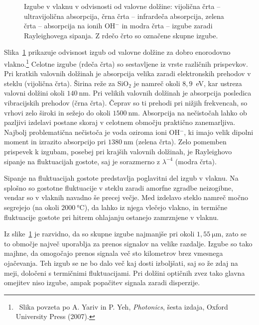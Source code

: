 \begin{figure}[ht]
\centering
\def\svgwidth{90truemm} 
 
\caption{Izgube v vlaknu v odvisnosti od valovne dolžine: vijolična črta --
ultravijolična absorpcija, 
črna črta -- infrardeča absorpcija, 
zelena črta -- absorpcija na ionih OH$^{-}$ in modra črta --
izgube zaradi Rayleighovega sipanja. Z rdečo črto so označene skupne izgube.}
\label{FibAbs}
\end{figure}
Slika~\ref{FibAbs} prikazuje odvisnost izgub od valovne dolžine 
za dobro enorodovno vlakno.\footnote{~Slika povzeta po
A. Yariv in P. Yeh, {\it Photonics}, šesta izdaja, Oxford
University Press (2007).}
Celotne izgube (rdeča črta)
so sestavljene iz vrste različnih prispevkov. 
Pri kratkih valovnih dolžinah je absorpcija velika zaradi elektronskih prehodov
v steklu (vijolična črta). 
Širina reže za SiO$_2$ je namreč okoli $8,9$~eV, 
kar ustreza valovni dolžini
okoli $140~\si{\nano\meter}$. Pri velikih valovnih dolžinah je absorpcija posledica
vibracijskih prehodov (črna črta). Čeprav so ti prehodi pri nižjih frekvencah, 
so vrhovi zelo široki in sežejo do okoli $1500~\si{\nano\meter}$. 
Absorpcija na nečistočah lahko ob pazljivi izdelavi postane skoraj v celotnem 
območju praktično zanemarljiva. 
Najbolj problematična nečistoča je voda oziroma ioni OH$^{-}$, ki imajo velik dipolni
moment in izrazito absorpcijo pri $1380~\si{\nano\meter}$ (zelena črta). Zelo pomemben prispevek k 
izgubam, posebej pri krajših valovnih dolžinah, je Rayleighovo sipanje na fluktuacijah 
gostote, 
saj je sorazmerno z $\lambda^{-4}$ (modra črta). 

\begin{remark}
Sipanje na fluktuacijah gostote predstavlja poglavitni del izgub v vlaknu. Na splošno
so gostotne fluktuacije v steklu zaradi amorfne zgradbe neizogibne, vendar so v vlaknih
navadno še precej večje. Med izdelavo steklo namreč močno segrejejo
(na okoli $2000~\si{\celsius}$), da lahko iz njega vlečejo vlakno, in termične 
fluktuacije gostote pri hitrem ohlajanju ostanejo zamrznjene v vlaknu. 
\end{remark}

Iz slike~\ref{FibAbs} je razvidno, da so skupne izgube najmanjše pri 
okoli $1,55~\si{\micro\meter}$, zato se to območje največ uporablja za prenos signalov
na velike razdalje. Izgube so tako majhne, da omogočajo prenos signala 
več sto kilometrov brez vmesnega ojačevanja. Teh izgub se  
ne bo dalo več kaj dosti izboljšati, saj so že zdaj na meji,
določeni s termičnimi fluktuacijami. Pri dolžini optičnih zvez tako glavna omejitev niso izgube,
ampak popačitev signala zaradi disperzije.

